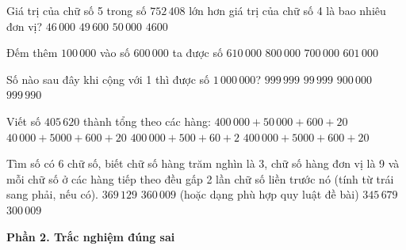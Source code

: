 \begin{ex} %
Giá trị của chữ số 5 trong số $752\,408$ lớn hơn giá trị của chữ số 4 là bao nhiêu đơn vị?
\choice
{$46\,000$}
{\True $49\,600$}
{$50\,000$}
{$4600$}
\end{ex}

\begin{ex} %
Đếm thêm $100\,000$ vào số $600\,000$ ta được số
\choice
{$610\,000$}
{$800\,000$}
{\True $700\,000$}
{$601\,000$}
\end{ex}

\begin{ex} %
Số nào sau đây khi cộng với 1 thì được số $1\,000\,000$?
\choice
{\True $999\,999$}
{$99\,999$}
{$900\,000$}
{$999\,990$}
\end{ex}

\begin{ex} %
Viết số $405\,620$ thành tổng theo các hàng:
\choice
{$400\,000 + 50\,000 + 600 + 20$}
{$40\,000 + 5000 + 600 + 20$}
{$400\,000 + 500 + 60 + 2$}
{\True $400\,000 + 5000 + 600 + 20$}
\end{ex}

\begin{ex} %
Tìm số có 6 chữ số, biết chữ số hàng trăm nghìn là 3, chữ số hàng đơn vị là 9 và mỗi chữ số ở các hàng tiếp theo đều gấp 2 lần chữ số liền trước nó (tính từ trái sang phải, nếu có).
\choice
{$369\,129$}
{\True $360\,009$ (hoặc dạng phù hợp quy luật đề bài)}
{$345\,679$}
{$300\,009$}
\end{ex}

\textbf{Phần 2. Trắc nghiệm đúng sai}

